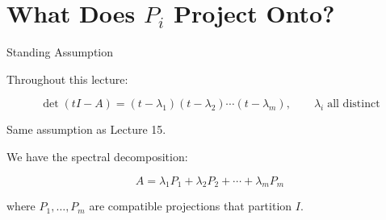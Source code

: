 \documentclass[10pt]{beamer}
\theoremstyle{definition}
\begin{document}
\section{\texorpdfstring{What Does $P_i$ Project Onto?}{What Does Pi Project Onto?}}


\begin{frame}[shrink=5]{Standing Assumption}

Throughout this lecture:

\vfill

$$\det(tI - A) = (t - \lambda_1)(t - \lambda_2)\cdots(t - \lambda_m), \qquad \lambda_i \;\text{all distinct}$$

\vfill

Same assumption as Lecture 15.

\vfill

We have the spectral decomposition:

$$A = \lambda_1 P_1 + \lambda_2 P_2 + \cdots + \lambda_m P_m$$

where $P_1, \ldots, P_m$ are compatible projections that partition $I$.

\end{frame}
\end{document}
